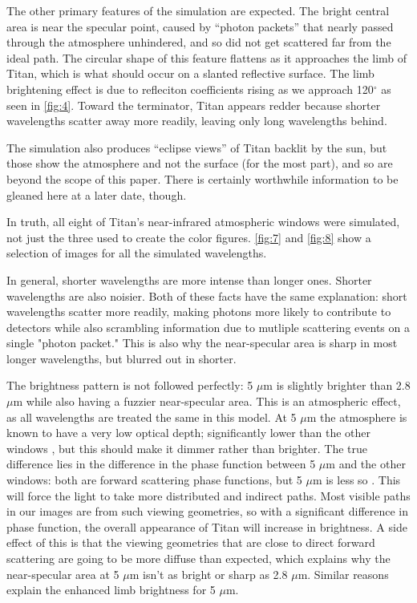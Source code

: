 \documentclass[twocolumn,linenumbers]{aastex631}
\begin{document}
The other primary features of the simulation are expected. The bright central area is near the specular point, caused by ``photon packets'' that nearly passed through the atmosphere unhindered, and so did not get scattered far from the ideal path. The circular shape of this feature flattens as it approaches the limb of Titan, which is what should occur on a slanted reflective surface. The limb brightening effect is due to refleciton coefficients rising as we approach 120$^{\circ}$ as seen in \ref{fig:4}. Toward the terminator, Titan appears redder because shorter wavelengths scatter away more readily, leaving only long wavelengths behind.

The simulation also produces ``eclipse views'' of Titan backlit by the sun, but those show the atmosphere and not the surface (for the most part), and so are beyond the scope of this paper. There is certainly worthwhile information to be gleaned here at a later date, though. 

In truth, all eight of Titan's near-infrared atmospheric windows were simulated, not just the three used to create the color figures. \ref{fig:7} and \ref{fig:8} show a selection of images for all the simulated wavelengths.

In general, shorter wavelengths are more intense than longer ones. Shorter wavelengths are also noisier. Both of these facts have the same explanation: short wavelengths scatter more readily, making photons more likely to contribute to detectors while also scrambling information due to mutliple scattering events on a single "photon packet." This is also why the near-specular area is sharp in most longer wavelengths, but blurred out in shorter.

The brightness pattern is not followed perfectly: 5 $\mu$m is slightly brighter than 2.8 $\mu$m while also having a fuzzier near-specular area. This is an atmospheric effect, as all wavelengths are treated the same in this model. At 5 $\mu$m the atmosphere is known to have a very low optical depth; significantly lower than the other windows \citep{EsSayeh2023}, but this should make it dimmer rather than brighter. The true difference lies in the difference in the phase function between 5 $\mu$m and the other windows: both are forward scattering phase functions, but 5 $\mu$m is less so \citep{Tomasko2008}. This will force the light to take more distributed and indirect paths. Most visible paths in our images are from such viewing geometries, so with a significant difference in phase function, the overall appearance of Titan will increase in brightness. A side effect of this is that the viewing geometries that are close to direct forward scattering are going to be more diffuse than expected, which explains why the near-specular area at 5 $\mu$m isn't as bright or sharp as 2.8 $\mu$m. Similar reasons explain the enhanced limb brightness for 5 $\mu$m.
\end{document}
